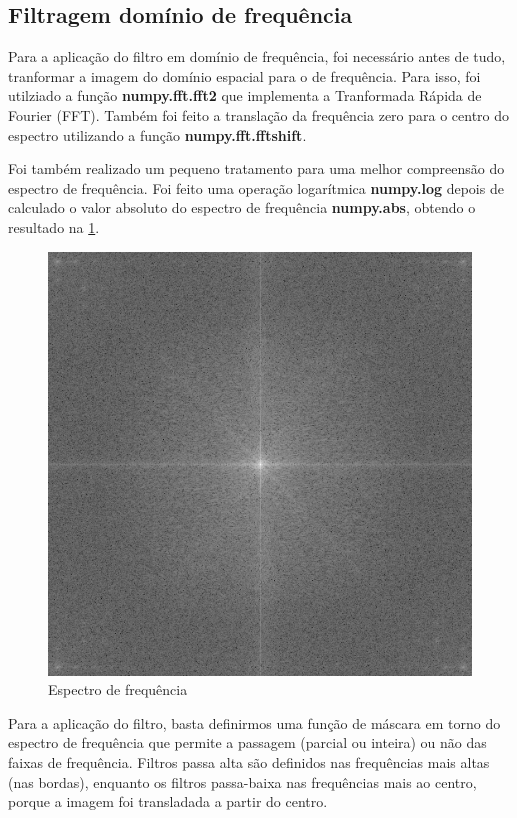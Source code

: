 \documentclass{article}
\begin{document}
\subsection{Filtragem domínio de frequência}

Para a aplicação do filtro em domínio de frequência, foi necessário antes de tudo, tranformar a imagem do domínio espacial para o de frequência. Para isso, foi utilziado a função \textbf{numpy.fft.fft2} que implementa a Tranformada Rápida de Fourier (FFT). Também foi feito a translação da frequência zero para o centro do espectro utilizando a função \textbf{numpy.fft.fftshift}.

Foi também realizado um pequeno tratamento para uma melhor compreensão do espectro de frequência. Foi feito uma operação logarítmica \textbf{numpy.log} depois de calculado o valor absoluto do espectro de frequência \textbf{numpy.abs}, obtendo o resultado na \ref{fig:espectro}.

\begin{figure}[h!]
    \includegraphics[width=\linewidth]{results/espectro.png}
    \caption{Espectro de frequência}
    \label{fig:espectro}
\end{figure}

Para a aplicação do filtro, basta definirmos uma função de máscara em torno do espectro de frequência que permite a passagem (parcial ou inteira) ou não das faixas de frequência. Filtros passa alta são definidos nas frequências mais altas (nas bordas), enquanto os filtros passa-baixa nas frequências mais ao centro, porque a imagem foi transladada a partir do centro.
\end{document}

